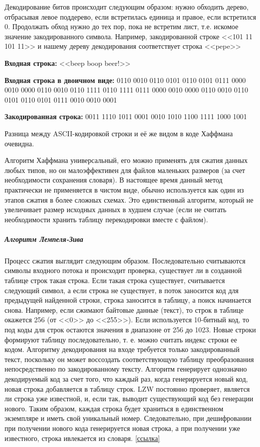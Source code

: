 Декодирование битов происходит следующим образом: нужно обходить дерево,
отбрасывая левое поддерево, если встретилась единица и правое, если
встретился 0. Продолжать обход нужно до тех пор, пока не встретим лист, т.е.
искомое значение закодированного символа. Например, закодированной строке
<<101 11 101 11>> и нашему дереву декодирования соответствует строка <<pepe>>

\noindent \textbf{Входная строка: }<<beep boop beer!>>

\noindent \textbf{Входная строка в двоичном виде:} 0110 0010 0110 0101 0110
0101 0111 0000 0010 0000 0110 0010 0110 1111 0110 1111 0111 0000 0010 0000
0110 0010 0110 0101 0110 0101 0111 0010 0010 0001

\noindent \textbf{Закодированная строка:} 0011 1110 1011 0001 0010 1010 1100
1111 1000 1001

Разница между ASCII-кодировкой строки и её же видом в коде Хаффмана очевидна.

Алгоритм Хаффмана универсальный, его можно применять для сжатия данных любых
типов, но он малоэффективен для файлов маленьких размеров (за счет
необходимости сохранения словаря). В настоящее время данный метод практически
не применяется в чистом виде, обычно используется как один из этапов сжатия в
более сложных схемах. Это единственный алгоритм, который не увеличивает
размер исходных данных в худшем случае (если не считать необходимости хранить
таблицу перекодировки вместе с файлом).

\subparagraph{Алгоритм Лемпеля-Зива}

Процесс сжатия выглядит следующим образом. Последовательно считываются
символы входного потока и происходит проверка, существует ли в созданной
таблице строк такая строка. Если такая строка существует, считывается
следующий символ, а если строка не существует, в поток заносится код для
предыдущей найденной строки, строка заносится в таблицу, а поиск начинается
снова. Например, если сжимают байтовые данные (текст), то строк в таблице
окажется 256 (от <<0>> до <<255>>). Если используется 10-битный код, то под
коды для строк остаются значения в диапазоне от 256 до 1023. Новые строки
формируют таблицу последовательно, т. е. можно считать индекс строки ее
кодом. Алгоритму декодирования на входе требуется только закодированный
текст, поскольку он может воссоздать соответствующую таблицу преобразования
непосредственно по закодированному тексту. Алгоритм генерирует однозначно
декодируемый код за счет того, что каждый раз, когда генерируется новый код,
новая строка добавляется в таблицу строк. LZW постоянно проверяет, является
ли строка уже известной, и, если так, выводит существующий код без генерации
нового. Таким образом, каждая строка будет храниться в единственном
экземпляре и иметь свой уникальный номер. Следовательно, при дешифровании при
получении нового кода генерируется новая строка, а при получении уже
известного, строка ивлекается из словаря.
\href{https://habrahabr.ru/post/132683/}{[ссылка]}

